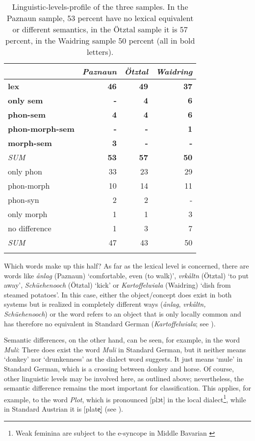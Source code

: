 \documentclass[output=paper]{langscibook}
\begin{document}
\begin{table}
\begin{tabularx}{.8\textwidth}{Qrrr}
\lsptoprule
& \textit{Paznaun} & \textit{Ötztal} & \textit{Waidring} \\
\midrule
\textbf{lex} & \textbf{46} & \textbf{49} & \textbf{37} \\
\textbf{only sem} & \textbf{-} &  \textbf{4} &  \textbf{6} \\
\textbf{phon-sem} & \textbf{4} & \textbf{4} &  \textbf{6} \\
\textbf{phon-morph-sem} & \textbf{-} & \textbf{-} &  \textbf{1} \\
\textbf{morph-sem} & \textbf{3} & \textbf{-} & \textbf{-}\\
\textit{SUM} & \textbf{53} & \textbf{57} & \textbf{50}\\
\midrule
only phon & 33 & 23 & 29 \\
phon-morph & 10 & 14 & 11\\
phon-syn & 2 & 2 & -\\
only morph & 1 & 1 & 3 \\
no difference & 1 & 3 & 7\\
\textit{SUM} & 47 & 43 & 50 \\
\lspbottomrule
\end{tabularx}
\caption{\label{tab:kathrein:4} Linguistic-levels-profile of the three samples. In the Paznaun sample, 53 percent have no lexical equivalent or different semantics, in the Ötztal sample it is 57 percent, in the Waidring sample 50 percent (all in bold letters).}
\end{table}

Which words make up this half? As far as the lexical level is concerned, there are words like \textit{ånlag} (Paznaun) ‘comfortable, even (to walk)’, \textit{vrkåltn} (Ötztal) ‘to put away’, \textit{Schüehenooch} (Ötztal) ‘kick’ or \textit{Kartoffelwiala} (Waidring) ‘dish from steamed potatoes’. In this case, either the object/concept does exist in both systems but is realized in completely different ways (\textit{ånlag}, \textit{vrkåltn, Schüehenooch}) or the word refers to an object that is only locally common and has therefore no equivalent in Standard German (\textit{Kartoffelwiala}; see ).

Semantic differences, on the other hand, can be seen, for example, in the word \textit{Muli}: There does exist the word \textit{Muli} in Standard German, but it neither means `donkey' nor `drunkenness' as the dialect word suggests. It just means `mule' in Standard German, which is a crossing between donkey and horse. Of course, other linguistic levels may be involved here, as outlined above; nevertheless, the semantic difference remains the most important for classification. This applies, for example, to the word \textit{Plot}, which is pronounced [plɔt] in the local dialect\footnote{Weak feminina are subject to the e-syncope in Middle Bavarian \citep[K. 57]{KleinEtAl1965}}, while in Standard Austrian it is [plate̞] (see ).
\end{document}
